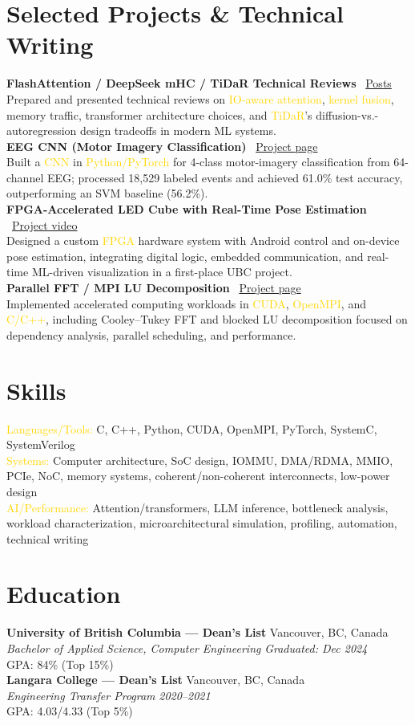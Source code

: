\documentclass[11pt]{article}
\newcommand{\gold}[1]{\textcolor{gold}{#1}}
\newcommand{\resumeSubheading}[4]{%
  \textbf{#1} \hfill #2\\
  \textit{#3} \hfill \textit{#4}\\
}
\begin{document}
\section{Selected Projects \& Technical Writing}
\textbf{FlashAttention / DeepSeek mHC / TiDaR Technical Reviews} \textbar\ \href{https://mauer4.github.io/post/}{Posts}\\
Prepared and presented technical reviews on \gold{IO-aware attention}, \gold{kernel fusion}, memory traffic, transformer architecture choices, and \gold{TiDaR}'s diffusion-vs.-autoregression design tradeoffs in modern ML systems.\\
\textbf{EEG CNN (Motor Imagery Classification)} \textbar\ \href{https://mauer4.github.io/project/eeg_cnn/}{Project page}\\
Built a \gold{CNN} in \gold{Python/PyTorch} for 4-class motor-imagery classification from 64-channel EEG; processed 18,529 labeled events and achieved 61.0\% test accuracy, outperforming an SVM baseline (56.2\%).\\
\textbf{FPGA-Accelerated LED Cube with Real-Time Pose Estimation} \textbar\ \href{https://www.youtube.com/watch?v=kbrSmiwQhu4&ab_channel=AdinMauer}{Project video}\\
Designed a custom \gold{FPGA} hardware system with Android control and on-device pose estimation, integrating digital logic, embedded communication, and real-time ML-driven visualization in a first-place UBC project.\\
\textbf{Parallel FFT / MPI LU Decomposition} \textbar\ \href{https://mauer4.github.io/project/parallel_fft/}{Project page}\\
Implemented accelerated computing workloads in \gold{CUDA}, \gold{OpenMPI}, and \gold{C/C++}, including Cooley--Tukey FFT and blocked LU decomposition focused on dependency analysis, parallel scheduling, and performance.

\section{Skills}
\gold{Languages/Tools:} C, C++, Python, CUDA, OpenMPI, PyTorch, SystemC, SystemVerilog\\
\gold{Systems:} Computer architecture, SoC design, IOMMU, DMA/RDMA, MMIO, PCIe, NoC, memory systems, coherent/non-coherent interconnects, low-power design\\
\gold{AI/Performance:} Attention/transformers, LLM inference, bottleneck analysis, workload characterization, microarchitectural simulation, profiling, automation, technical writing

\section{Education}
\resumeSubheading{University of British Columbia --- Dean's List}{Vancouver, BC, Canada}{Bachelor of Applied Science, Computer Engineering}{Graduated: Dec 2024}
GPA: 84\% (Top 15\%)\\
\resumeSubheading{Langara College --- Dean's List}{Vancouver, BC, Canada}{Engineering Transfer Program}{2020--2021}
GPA: 4.03/4.33 (Top 5\%)
\end{document}
